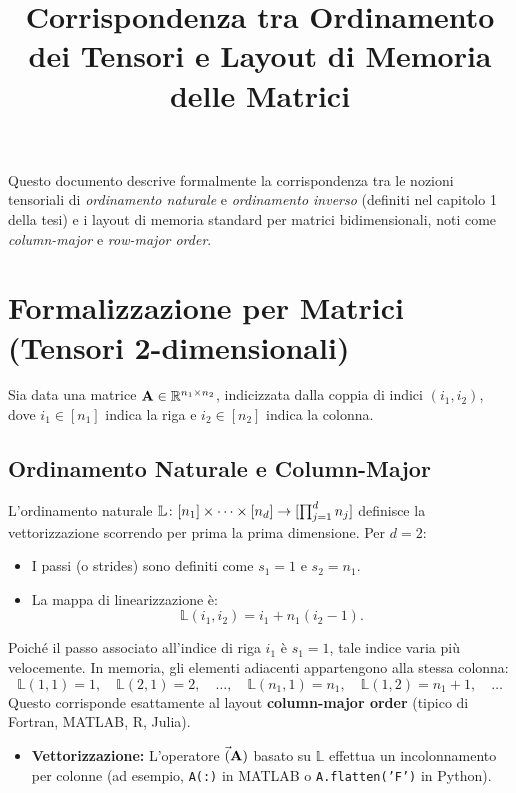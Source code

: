 \documentclass{article}
\title{Corrispondenza tra Ordinamento dei Tensori e Layout di Memoria delle Matrici}
\author{}
\date{}
\renewcommand{\L}{\mathbb{L}}
\begin{document}
\maketitle

Questo documento descrive formalmente la corrispondenza tra le nozioni tensoriali di \emph{ordinamento naturale} e \emph{ordinamento inverso} (definiti nel capitolo 1 della tesi) e i layout di memoria standard per matrici bidimensionali, noti come \emph{column-major} e \emph{row-major order}.

\section{Formalizzazione per Matrici (Tensori 2-dimensionali)}

Sia data una matrice $\Mx{A} \in \mathbb{R}^{n_1 \times n_2}$, indicizzata dalla coppia di indici $(i_1, i_2)$, dove $i_1 \in [n_1]$ indica la riga e $i_2 \in [n_2]$ indica la colonna. 

\subsection{Ordinamento Naturale e Column-Major}
L'ordinamento naturale $\L \colon \mdom! \to [\prod_{j=1}^d n_j]$ definisce la vettorizzazione scorrendo per prima la prima dimensione. Per $d=2$:
\begin{itemize}
    \item I passi (o strides) sono definiti come $s_1 = 1$ e $s_2 = n_1$.
    \item La mappa di linearizzazione è:
    \[
    \L(i_1, i_2) = i_1 + n_1 (i_2 - 1).
    \]
\end{itemize}
Poiché il passo associato all'indice di riga $i_1$ è $s_1 = 1$, tale indice varia più velocemente. In memoria, gli elementi adiacenti appartengono alla stessa colonna:
\[
\L(1,1) = 1, \quad \L(2,1) = 2, \quad \dots, \quad \L(n_1,1) = n_1, \quad \L(1,2) = n_1 + 1, \quad \dots
\]
Questo corrisponde esattamente al layout \textbf{column-major order} (tipico di Fortran, MATLAB, R, Julia).
\begin{itemize}
    \item \textbf{Vettorizzazione:} L'operatore $\Vec(\Mx{A})$ basato su $\L$ effettua un incolonnamento per colonne (ad esempio, \texttt{A(:)} in MATLAB o \texttt{A.flatten('F')} in Python).
\end{itemize}
\end{document}
